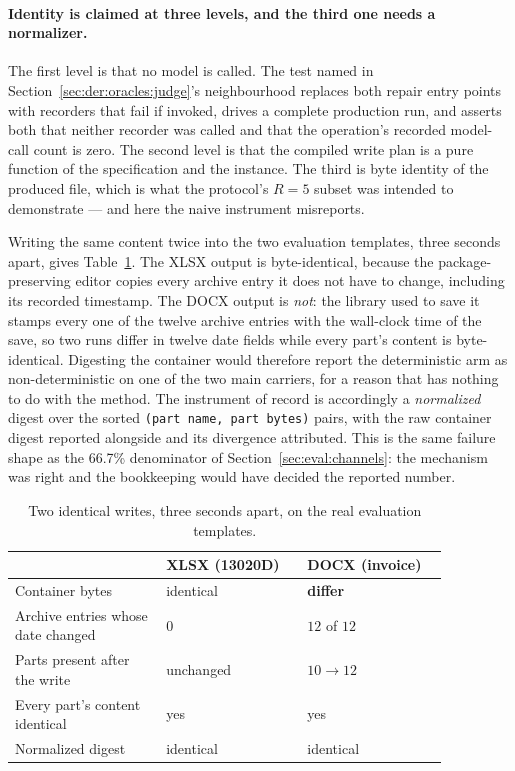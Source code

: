 \paragraph{Identity is claimed at three levels, and the third one needs a normalizer.}
The first level is that no model is called. The test named in
Section~\ref{sec:der:oracles:judge}'s neighbourhood replaces both repair entry points with
recorders that fail if invoked, drives a complete production run, and asserts both that
neither recorder was called and that the operation's recorded model-call count is zero. The
second level is that the compiled write plan is a pure function of the specification and the
instance. The third is byte identity of the produced file, which is what the protocol's $R=5$
subset was intended to demonstrate --- and here the naive instrument misreports.

Writing the same content twice into the two evaluation templates, three seconds apart, gives
Table~\ref{tab:eval:identity}. The XLSX output is byte-identical, because the
package-preserving editor copies every archive entry it does not have to change, including its
recorded timestamp. The DOCX output is \emph{not}: the library used to save it stamps every one
of the twelve archive entries with the wall-clock time of the save, so two runs differ in
twelve date fields while every part's content is byte-identical. Digesting the container would
therefore report the deterministic arm as non-deterministic on one of the two main carriers,
for a reason that has nothing to do with the method. The instrument of record is accordingly a
\emph{normalized} digest over the sorted \texttt{(part name, part bytes)} pairs, with the raw
container digest reported alongside and its divergence attributed. This is the same failure
shape as the 66.7\% denominator of Section~\ref{sec:eval:channels}: the mechanism was right and
the bookkeeping would have decided the reported number.

\begin{table}[htbp]
\centering
\caption{Two identical writes, three seconds apart, on the real evaluation templates.}
\label{tab:eval:identity}
\begin{tabular}{p{0.30\linewidth}p{0.28\linewidth}p{0.28\linewidth}}
\hline
 & \textbf{XLSX (13020D)} & \textbf{DOCX (invoice)} \\
\hline
Container bytes & identical & \textbf{differ} \\
Archive entries whose date changed & $0$ & $12$ of $12$ \\
Parts present after the write & unchanged & $10 \rightarrow 12$ \\
Every part's content identical & yes & yes \\
Normalized digest & identical & identical \\
\hline
\end{tabular}
\end{table}

